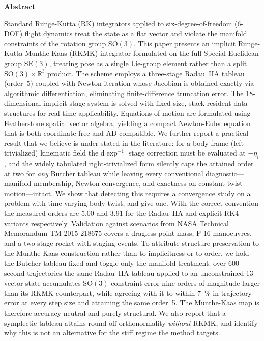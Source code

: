 \documentclass[a4paper,10pt]{article}
\newcommand{\SO}{\mathrm{SO}(3)}
\newcommand{\SE}{\mathrm{SE}(3)}
\newcommand{\dexp}{\mathrm{d}\exp}
\newcommand{\R}{\mathbb{R}}
\theoremstyle{definition}
\begin{document}
\begin{center}
  \begin{minipage}{0.92\linewidth}
    \small\textbf{Abstract}

    Standard Runge-Kutta (RK) integrators applied to six-degree-of-freedom
    (6-DOF) flight dynamics treat the state as a flat vector and violate the
    manifold constraints of the rotation group $\SO$.  This paper presents an
    implicit Runge-Kutta-Munthe-Kaas (RKMK) integrator formulated on the full
    Special Euclidean group $\SE$, treating pose as a single Lie-group element
    rather than a split $\SO \times \R^3$ product.  The scheme employs a
    three-stage Radau~IIA tableau (order~5) coupled with Newton iteration whose
    Jacobian is obtained exactly via algorithmic differentiation, eliminating
    finite-difference truncation error.  The 18-dimensional implicit stage
    system is solved with fixed-size, stack-resident data structures for
    real-time applicability.  Equations of motion are formulated using
    Featherstone spatial vector algebra, yielding a compact Newton-Euler
    equation that is both coordinate-free and AD-compatible.  We further report
    a practical result that we believe is under-stated in the literature: for a
    body-frame (left-trivialized) kinematic field the $\dexp^{-1}$ stage
    correction must be evaluated at $-\eta_i$, and the widely tabulated
    right-trivialized form silently caps the attained order at two for
    \emph{any} Butcher tableau while leaving every conventional
    diagnostic---manifold membership, Newton convergence, and exactness on
    constant-twist motion---intact.  We show that detecting this requires a
    convergence study on a problem with time-varying body twist, and give one.
    With the correct convention the measured orders are 5.00 and 3.91 for the
    Radau~IIA and explicit RK4 variants respectively.  Validation against
    scenarios from NASA Technical Memorandum TM-2015-218675 covers a dragless
    point mass, F-16 manoeuvres, and a two-stage rocket with staging events.
    To attribute structure preservation to the Munthe-Kaas construction rather
    than to implicitness or to order, we hold the Butcher tableau fixed and
    toggle only the manifold treatment: over 600-second trajectories the same
    Radau~IIA tableau applied to an unconstrained 13-vector state accumulates
    $\SO$ constraint error nine orders of magnitude larger than its RKMK
    counterpart, while agreeing with it to within \SI{7}{\percent} in
    trajectory error at every step size and attaining the same order~5.  The
    Munthe-Kaas map is therefore accuracy-neutral and purely structural.  We
    also report that a symplectic tableau attains round-off orthonormality
    \emph{without} RKMK, and identify why this is not an alternative for the
    stiff regime the method targets.
  \end{minipage}
\end{center}
\end{document}
